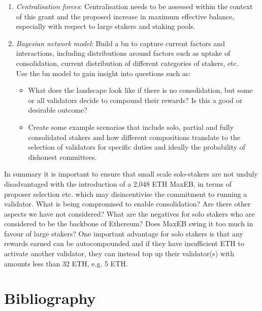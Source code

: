 \documentclass[UTF8]{article}
\begin{document}
\begin{enumerate}
\item \textit{Centralisation forces}: 
Centralisation needs to be assessed within the context of this grant and the proposed increase in maximum effective balance, especially with respect to large stakers and staking pools.

\item \textit{Bayesian network model}: Build a \gls{bn} to capture current factors and interactions, including distributions around factors such as uptake of consolidation, current distribution of different categories of stakers, etc. \\
Use the \gls{bn} model to gain insight into questions such as:
	\begin{itemize}
	\item What does the landscape look like if there is no consolidation, but some or all validators decide to compound their rewards? Is this a good or desirable outcome? 
	\item Create some example scenarios that include solo, partial and fully consolidated stakers and how different compositions translate to the selection of validators for specific duties and ideally the probability of dishonest committees.
	\end{itemize}
 
\end{enumerate}

In summary it is important to ensure that small scale solo-stakers are not unduly disadvantaged with the introduction of a 2,048 ETH MaxEB, in terms of proposer selection etc. which may disincentivise the commitment to running a validator. What is being compromised to enable consolidation? Are there other aspects we have not considered? What are the negatives for solo stakers who are considered to be the backbone of Ethereum? Does MaxEB swing it too much in favour of large stakers? One important advantage for solo stakers is that any rewards earned can be autocompounded and if they have insufficient ETH to activate another validator, they can instead top up their validator(s) with amounts less than 32 ETH, e.g. 5 ETH.












\section{Bibliography}
\nocite{*}


\end{document}
